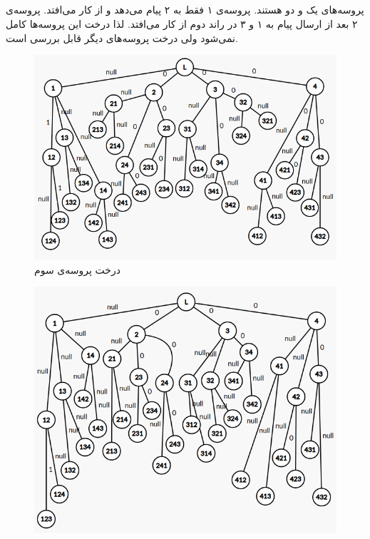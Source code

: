 \documentclass{article}
\begin{document}
\begin{multicols}{2}
\section{}
پروسه‌های یک و دو
هستند. پروسه‌ی ۱ فقط به ۲ پیام می‌دهد و از کار می‌افتد. پروسه‌ی ۲ بعد از ارسال پیام به ۱ و ۳ در راند دوم از کار می‌افتد.
لذا درخت این پروسه‌ها کامل نمی‌شود ولی درخت پروسه‌های دیگر قابل بررسی است.
\begin{figure}[H]
    \centering
    \includegraphics[width=0.99\linewidth]{Photos/HW5/p3.png}
    \caption{
    درخت پروسه‌ی سوم
    }
    \label{fig:my_label}
\end{figure}
\begin{figure}[H]
    \centering
    \includegraphics[width=0.99\linewidth]{Photos/HW5/p4.png}

\end{figure}
\end{multicols}
\end{document}
